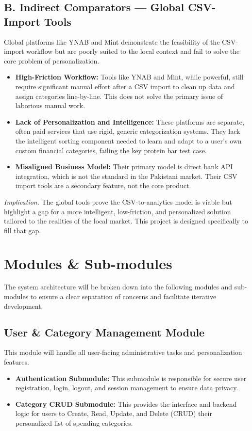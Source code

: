 \documentclass[11pt,a4paper]{report}
\begin{document}
\subsection{B. Indirect Comparators — Global CSV-Import Tools}
Global platforms like YNAB and Mint demonstrate the feasibility of the CSV-import workflow but are poorly suited to the local context and fail to solve the core problem of personalization.
\begin{itemize}
	\item \textbf{High-Friction Workflow:} Tools like YNAB and Mint, while powerful, still require significant manual effort after a CSV import to clean up data and assign categories line-by-line. This does not solve the primary issue of laborious manual work.
	\item \textbf{Lack of Personalization and Intelligence:} These platforms are separate, often paid services that use rigid, generic categorization systems. They lack the intelligent sorting component needed to learn and adapt to a user's own custom financial categories, failing the key protein bar test case.
	\item \textbf{Misaligned Business Model:} Their primary model is direct bank API integration, which is not the standard in the Pakistani market. Their CSV import tools are a secondary feature, not the core product.
\end{itemize}
\textit{Implication.} The global tools prove the CSV-to-analytics model is viable but highlight a gap for a more intelligent, low-friction, and personalized solution tailored to the realities of the local market. This project is designed specifically to fill that gap.

\section{Modules \& Sub-modules}
The system architecture will be broken down into the following modules and sub-modules to ensure a clear separation of concerns and facilitate iterative development.

\subsection{User \& Category Management Module}
This module will handle all user-facing administrative tasks and personalization features.
\begin{itemize}
	\item \textbf{Authentication Submodule:} This submodule is responsible for secure user registration, login, logout, and session management to ensure data privacy.
	\item \textbf{Category CRUD Submodule:} This provides the interface and backend logic for users to Create, Read, Update, and Delete (CRUD) their personalized list of spending categories.
\end{itemize}
\end{document}

